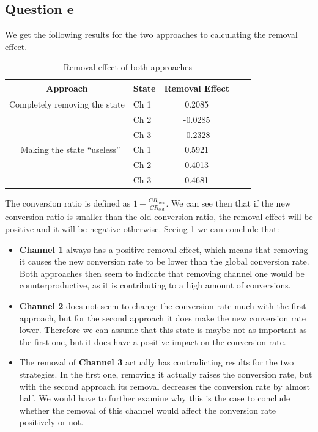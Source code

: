 \documentclass[11pt, a4paper]{article}
\begin{document}
\subsection{Question e}
We get the following results for the two approaches to calculating the removal effect.
\begin{table}[H]
	\centering  
	\begin{tabular}{clccc}
		\toprule
		          Approach            & State & Removal Effect &  &  \\ \midrule
		Completely removing the state & Ch 1  &     0.2085     &  &  \\
		                              & Ch 2  &    -0.0285     &  &  \\
		                              & Ch 3  &    -0.2328     &  &  \\ 
		Making the state ``useless''  & Ch 1  &     0.5921     &  &  \\
		                              & Ch 2  &     0.4013     &  &  \\
		                              & Ch 3  &     0.4681     &  &  \\ \bottomrule
	\end{tabular}
	\caption{Removal effect of both approaches}
	\label{tab:removal-effect}
\end{table}
The conversion ratio is defined as $1 - \frac{CR_{new}}{CR_{old}}$. We can see then that if the new conversion ratio is smaller than the old conversion ratio, the removal effect will be positive and it will be negative otherwise.
Seeing \cref{tab:removal-effect} we can conclude that:
\begin{itemize}
	\item \textbf{Channel 1} always has a positive removal effect, which means that removing it causes the new conversion rate to be lower than the global conversion rate. Both approaches then seem to indicate that removing channel one would be counterproductive, as it is contributing to a high amount of conversions.
	\item \textbf{Channel 2} does not seem to change the conversion rate much with the first approach, but for the second approach it does make the new conversion rate lower. Therefore we can assume that this state is maybe not as important as the first one, but it does have a positive impact on the conversion rate.
	\item The removal of \textbf{Channel 3} actually has contradicting results for the two strategies. In the first one, removing it actually raises the conversion rate, but with the second approach its removal decreases the conversion rate by almost half. We would have to further examine why this is the case to conclude whether the removal of this channel would affect the conversion rate positively or not.
\end{itemize}
\end{document}
